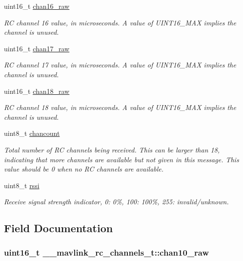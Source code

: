 \begin{DoxyCompactItemize}
uint16\+\_\+t \hyperlink{struct____mavlink__rc__channels__t_a5585d9ec6a1d8aeb172a65386e480aed}{chan16\+\_\+raw}
\begin{DoxyCompactList}\small\item\em R\+C channel 16 value, in microseconds. A value of U\+I\+N\+T16\+\_\+\+M\+A\+X implies the channel is unused. \end{DoxyCompactList}\item 
uint16\+\_\+t \hyperlink{struct____mavlink__rc__channels__t_a8a12c6951b2b98bed314dc150a0b3717}{chan17\+\_\+raw}
\begin{DoxyCompactList}\small\item\em R\+C channel 17 value, in microseconds. A value of U\+I\+N\+T16\+\_\+\+M\+A\+X implies the channel is unused. \end{DoxyCompactList}\item 
uint16\+\_\+t \hyperlink{struct____mavlink__rc__channels__t_aca5ac7a138aeac9df125ee52cefa540e}{chan18\+\_\+raw}
\begin{DoxyCompactList}\small\item\em R\+C channel 18 value, in microseconds. A value of U\+I\+N\+T16\+\_\+\+M\+A\+X implies the channel is unused. \end{DoxyCompactList}\item 
uint8\+\_\+t \hyperlink{struct____mavlink__rc__channels__t_adccfe2b2c6e7796170de70c82faf38c1}{chancount}
\begin{DoxyCompactList}\small\item\em Total number of R\+C channels being received. This can be larger than 18, indicating that more channels are available but not given in this message. This value should be 0 when no R\+C channels are available. \end{DoxyCompactList}\item 
uint8\+\_\+t \hyperlink{struct____mavlink__rc__channels__t_abe7cb3691d12fff362b8758802b4b85b}{rssi}
\begin{DoxyCompactList}\small\item\em Receive signal strength indicator, 0\+: 0\%, 100\+: 100\%, 255\+: invalid/unknown. \end{DoxyCompactList}\end{DoxyCompactItemize}


\subsection{Field Documentation}
\hypertarget{struct____mavlink__rc__channels__t_a96b3e25a62c6750e5fb5f48af2215c13}{
\subsubsection[{chan10\+\_\+raw}]{\setlength{\rightskip}{0pt plus 5cm}uint16\+\_\+t \+\_\+\+\_\+mavlink\+\_\+rc\+\_\+channels\+\_\+t\+::chan10\+\_\+raw}}\label{struct____mavlink__rc__channels__t_a96b3e25a62c6750e5fb5f48af2215c13}


